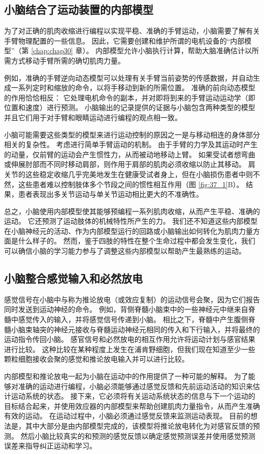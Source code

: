 \subsection{小脑结合了运动装置的内部模型}

为了对正确的肌肉收缩进行编程以实现平稳、准确的手臂运动，小脑需要了解有关手臂物理配置的一些信息。
因此，它需要创建和维护所谓的电机设备的“内部模型”（第 \ref{chap:chap30} 章）。
内部模型允许小脑执行计算，帮助大脑准确估计以所需方式移动手臂所需的确切肌肉力量。


例如，准确的手臂逆向动态模型可以处理有关手臂当前姿势的传感数据，并自动生成一系列定时和缩放的命令，以将手移动到新的所需位置。
准确的前向动态模型的作用恰恰相反：
它处理电机命令的副本，并对即将到来的手臂运动运动学（即位置和速度）进行预测。 小脑输出的记录提供的证据与小脑包含两种类型的模型并且它们用于对手臂和眼睛运动进行编程的观点相一致。

小脑可能需要这些类型的模型来进行运动控制的原因之一是与移动相连的身体部分相关的复杂性。
考虑进行简单手臂运动的机制。
由于手臂的力学及其运动时产生的动量，仅前臂的运动会产生惯性力，从而被动地移动上臂。
如果受试者想弯曲或伸展肘部而不同时移动肩部，则作用于肩部的肌肉必须收缩以防止其移动。
肩关节的这些稳定收缩几乎完美地发生在健康受试者身上，但在小脑损伤患者中则不然，这些患者难以控制肢体多个节段之间的惯性相互作用（图 \ref{fig:37_1}B）。
结果，患者表现出多关节运动与单关节运动相比更大的不准确性。


总之，小脑使用内部模型使其能够预编程一系列肌肉收缩，从而产生平稳、准确的运动。
它还预测了运动肢体的机械特性所产生的力。 我们还不知道这些内部模型在小脑神经元的活动、作为内部模型运行的回路或小脑输出如何转化为肌肉力量方面是什么样子的。 然而，鉴于四肢的特性在整个生命过程中都会发生变化，我们可以确信小脑的学习能力参与了调整这些内部模型以帮助产生最熟练的运动。

\subsection{小脑整合感觉输入和必然放电}
感觉信号在小脑中与称为推论放电（或效应复制）的运动信号会聚，因为它们报告同时发送到运动神经的命令。 例如，背侧脊髓小脑束中的一些神经元中继来自脊髓中感觉传入的输入，并将感觉信号传递到小脑。 相比之下，脊髓中产生腹侧脊髓小脑束轴突的神经元接收与脊髓运动神经元相同的传入和下行输入，并将最终的运动指令传回小脑。 感官信号和必然放电的相互作用允许将运动计划与感官结果进行比较。 这种比较在某种程度上发生在浦肯野细胞，但我们现在知道至少一些颗粒细胞接收会聚的感觉和推论放电输入并可以进行比较。

内部模型和推论放电一起为小脑在运动中的作用提供了一种可能的解释。 为了能够对准确的运动进行编程，小脑必须能够通过感觉反馈和先前运动活动的知识来估计运动系统的状态。 接下来，它必须将有关运动系统状态的信息与下一个运动的目标结合起来，并使用效应器的内部模型来帮助创建肌肉力量指令，从而产生准确有效的运动。 在运动过程中，小脑必须通过感觉反馈来监测运动表现。 目前的想法是，其中大部分是由内部模型完成的，该模型将推论放电转化为对感官反馈的预测。 然后小脑比较真实的和预测的感觉反馈以确定感觉预测误差并使用感觉预测误差来指导纠正运动和学习。

